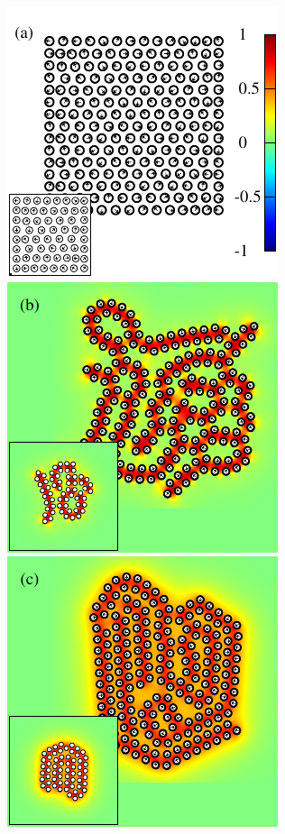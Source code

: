 \documentclass[aps,prl,preprint,groupedaddress]{revtex4-2}
\begin{document}
\begin{figure}[h!]
\begin{center}
  \includegraphics[height=0.3\textheight]{Nb198a_inset.pdf}
  \includegraphics[height=0.3\textheight]{Nb198b_eta_inset.pdf}\\
  \includegraphics[height=0.3\textheight]{Nb198c_eta_inset.pdf}

\end{center}
\end{figure}
\end{document}
